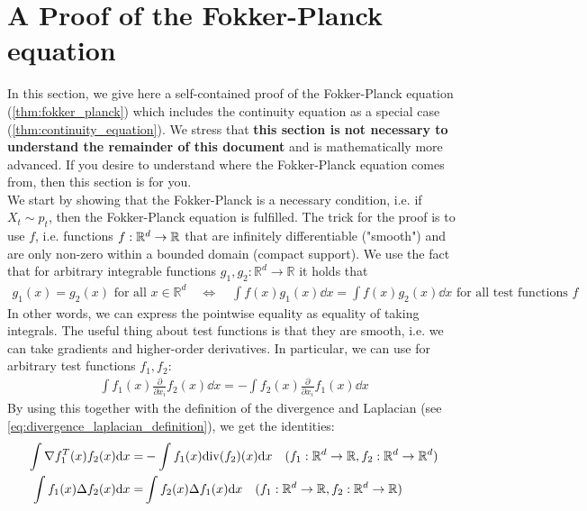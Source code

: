 \section{A Proof of the Fokker-Planck equation}
\label{subsec:proof_fokker_planck}
In this section, we give here a self-contained proof of the Fokker-Planck equation (\cref{thm:fokker_planck}) which includes the continuity equation as a special case (\cref{thm:continuity_equation}). We stress that \textbf{this section is not necessary to understand the remainder of this document} and is mathematically more advanced. If you desire to understand where the Fokker-Planck equation comes from, then this section is for you.\\

We start by showing that the Fokker-Planck is a necessary condition, i.e. if $X_t\sim p_t$, then the Fokker-Planck equation is fulfilled. The trick for the proof is to use  $f$, i.e. functions $f:\mathbb{R}^d\to\mathbb{R}$ that are infinitely differentiable ("smooth") and are only non-zero within a bounded domain (compact support). We use the fact that for arbitrary integrable functions $g_1,g_2:\mathbb{R}^d\to\mathbb{R}$ it holds that
\begin{align}
\label{eq:test_function_usecase}
g_1(x) = g_2(x)\text{ for all }x\in\mathbb{R}^d\quad \Leftrightarrow \quad \int f(x) g_1(x)\dd x = \int f(x) g_2(x)\dd x\text{ for all test functions }f
\end{align}
In other words, we can express the pointwise equality as equality of taking integrals. The useful thing about test functions is that they are smooth, i.e. we can take gradients and higher-order derivatives. In particular, we can use  for arbitrary test functions $f_1,f_2$:
\begin{align}
    \int f_1(x) \frac{\partial}{\partial x_i}f_2(x)\dd x = - \int f_2(x) \frac{\partial}{\partial x_i}f_1(x)\dd x
\end{align}
By using this together with the definition of the divergence and Laplacian (see \cref{eq:divergence_laplacian_definition}), we get the identities:
\begin{align}
\label{eq:integration_by_parts_divergence}
    \int \nabla f_1^T(x) f_2(x)\mathrm{d} x =& -\int f_1(x)\mathrm{div}(f_2)(x)\mathrm{d} x \quad (f_1:\mathbb{R}^d\to\mathbb{R},f_2:\mathbb{R}^d\to\mathbb{R}^d)\\
\label{eq:integration_by_parts_laplacian}
    \int f_1(x) \Delta f_2(x) \mathrm{d} x =& \int f_2(x) \Delta f_1(x) \mathrm{d} x\quad (f_1:\mathbb{R}^d\to\mathbb{R},f_2:\mathbb{R}^d\to\mathbb{R})
\end{align}



